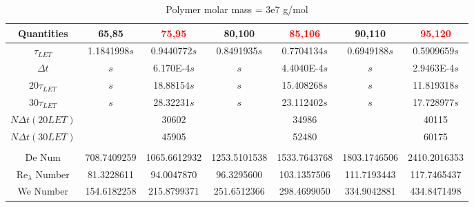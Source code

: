 \documentclass[]{article}
\begin{document}
\begin{table}[h]
 \centering
 \caption{Polymer molar mass = 3e7 g/mol}
\label{table1}
\begin{tabular}{ccccccc}
\hline
\textbf{Quantities}&  \textbf{65,85}& \textcolor{red}{\textbf{75,95}}& \textbf{80,100}& \textcolor{red}{\textbf{85,106}}& \textbf{90,110}& \textcolor{red}{\textbf{95,120}}\\ 
\hline


$\tau_{LET}$ &     1.1841998$s$ &   0.9440772$s$ &   0.8491935$s$ &   0.7704134$s$ &   0.6949188$s$ &   0.5909659$s$\\ 
$\Delta t$       &      $s$ &   6.170E-4$s$ &   $s$ &    4.4040E-4$s$ &   $s$ & 2.9463E-4$s$\\ 
$ 20 \tau_{LET}$ &      $s$ &   18.88154$s$  &  $s$ &    15.408268$s$ &   $s$ & 11.819318$s$  \\
$ 30 \tau_{LET}$ &      $s$ &   28.32231$s$  &  $s$ &    23.112402$s$ &   $s$ & 17.728977$s$  \\
$N \Delta t (20LET)$              &     &  30602             &      & 34986           &     &40115    \\ 
$N \Delta t (30LET)$              &     &  45905             &      & 52480      &          &60175    \\ 

\hline
\\
De Num &     708.7409259 &   1065.6612932 &   1253.5101538 &   1533.7643768 &   1803.1746506 &   2410.2016353\\ 
Re$_\lambda$ Number &     81.3228611 &   94.0047870 &   96.3295600 &   103.1357506 &   111.7193443 &   117.7465437\\ 
We Number &      154.6182258 &  215.8799371 &   251.6512366 &   298.4699050 &   334.9042881 &   434.8471498\\ 
\end{tabular}
\end{table}
\end{document}
